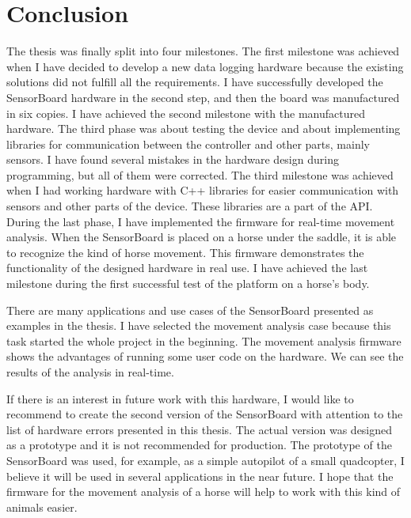 \chapter{Conclusion}
The thesis was finally split into four milestones. The first milestone was achieved when I have decided to develop a new data logging hardware because the existing solutions did not fulfill all the requirements. I have successfully developed the SensorBoard hardware in the second step, and then the board was manufactured in six copies. I have achieved the second milestone with the manufactured hardware. The third phase was about testing the device and about implementing libraries for communication between the controller and other parts, mainly sensors. I have found several mistakes in the hardware design during programming, but all of them were corrected. The third milestone was achieved when I had working hardware with C++ libraries for easier communication with sensors and other parts of the device. These libraries are a part of the API. During the last phase, I have implemented the firmware for real-time movement analysis. When the SensorBoard is placed on a horse under the saddle, it is able to recognize the kind of horse movement. This firmware demonstrates the functionality of the designed hardware in real use. I have achieved the last milestone during the first successful test of the platform on a horse's body.

There are many applications and use cases of the SensorBoard presented as examples in the thesis. I have selected the movement analysis case because this task started the whole project in the beginning. The movement analysis firmware shows the advantages of running some user code on the hardware. We can see the results of the analysis in real-time.

If there is an interest in future work with this hardware, I would like to recommend to create the second version of the SensorBoard with attention to the list of hardware errors presented in this thesis. The actual version was designed as a prototype and it is not recommended for production. The prototype of the SensorBoard was used, for example, as a simple autopilot of a small quadcopter, I believe it will be used in several applications in the near future. I hope that the firmware for the movement analysis of a horse will help to work with this kind of animals easier.
